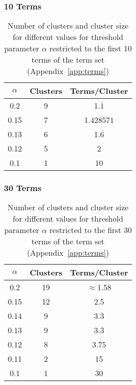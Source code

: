 \subsubsection{10 Terms}
\label{app:alpha_10terms}
\begin{table}[h]
    \centering
    \begin{tabular}{|c|c|c|}
        \hline
        $\alpha$ & Clusters & Terms/Cluster  \\
        \hline
        0.2 & 9 & 1.$\overline{1}$ \\
        0.15 & 7 & 1.$\overline{428571}$ \\
        0.13 & 6 & 1.$\overline{6}$ \\
        0.12 & 5 & 2 \\
        0.1 & 1 & 10 \\
        \hline
    \end{tabular}
    \caption{Number of clusters and cluster size for different values for threshold parameter $\alpha$ restricted to the first 10 terms of the
            term set (Appendix~\ref{app:terms})}
    \label{tab:app_10terms}
\end{table}


\subsubsection{30 Terms}
\label{app:alpha_30terms}
\begin{table}[h]
    \centering
    \begin{tabular}{|c|c|c|}
        \hline
        $\alpha$ & Clusters & Terms/Cluster  \\
        \hline
        0.2 & 19 & $\approx$1.58 \\
        0.15 & 12 & 2.5 \\
        0.14 & 9 & 3.$\overline{3}$ \\
        0.13 & 9 & 3.$\overline{3}$ \\
        0.12 & 8 & 3.75 \\
        0.11 & 2 & 15 \\
        0.1 & 1 & 30 \\
        \hline
    \end{tabular}
    \caption{Number of clusters and cluster size for different values for threshold parameter $\alpha$ restricted to the first 30 terms of the
            term set (Appendix~\ref{app:terms})}
    \label{tab:app_30terms}
\end{table}


